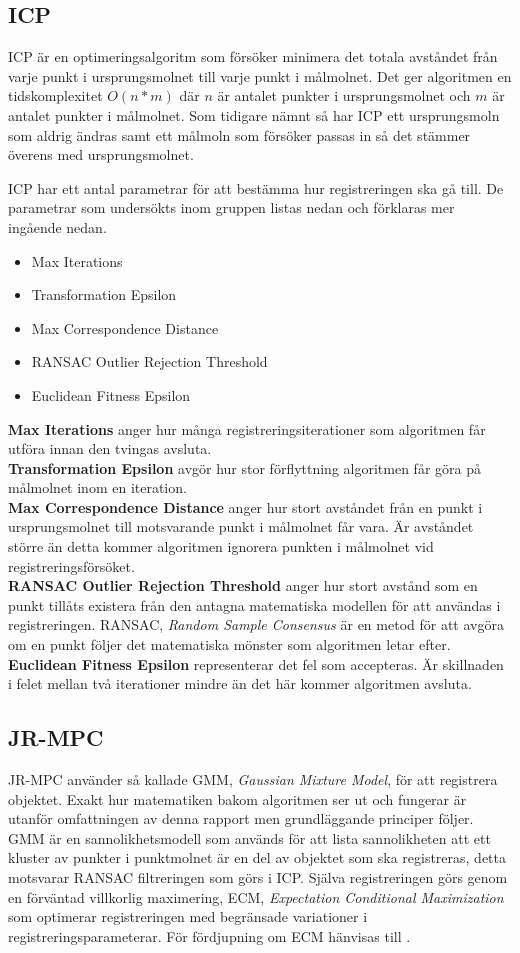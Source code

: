 \subsection{ICP}
ICP är en optimeringsalgoritm som försöker minimera det totala avståndet från varje punkt i ursprungsmolnet till varje punkt i målmolnet. Det ger algoritmen en tidskomplexitet $ \mathit{O(n*m)} $ där $ \mathit{n} $ är antalet punkter i ursprungsmolnet och $ \mathit{m} $ är antalet punkter i målmolnet. Som tidigare nämnt så har ICP ett ursprungsmoln som aldrig ändras samt ett målmoln som försöker passas in så det stämmer överens med ursprungsmolnet. 

ICP har ett antal parametrar för att bestämma hur registreringen ska gå till. De parametrar som undersökts inom gruppen listas nedan och förklaras mer ingående nedan.
\begin{itemize}
	\item Max Iterations
	\item Transformation Epsilon
	\item Max Correspondence Distance
	\item RANSAC Outlier Rejection Threshold
	\item Euclidean Fitness Epsilon
\end{itemize}
\textbf{Max Iterations} anger hur många registrerings\-iterationer som algoritmen får utföra innan den tvingas avsluta.\\
\textbf{Transformation Epsilon} avgör hur stor förflyttning algoritmen får göra på målmolnet inom en iteration.\\
\textbf{Max Correspondence Distance} anger hur stort avståndet från en punkt i ursprungsmolnet till motsvarande punkt i målmolnet får vara. Är avståndet större än detta kommer algoritmen ignorera punkten i målmolnet vid registreringsförsöket.\\
\textbf{RANSAC Outlier Rejection Threshold} anger hur stort avstånd som en punkt tillåts existera från den antagna matematiska modellen för att användas i registreringen. RANSAC, \textit{Random Sample Consensus} är en metod för att avgöra om en punkt följer det matematiska mönster som algoritmen letar efter.\\
\textbf{Euclidean Fitness Epsilon} representerar det fel som accepteras. Är skillnaden i felet mellan två iterationer mindre än det här kommer algoritmen avsluta.

\subsection{JR-MPC}
JR-MPC använder så kallade GMM, \textit{Gaussian Mixture Model}, för att registrera objektet. Exakt hur matematiken bakom algoritmen ser ut och fungerar är utanför omfattningen av denna rapport men grundläggande principer följer. GMM är en sannolikhetsmodell som används för att lista sannolikheten att ett kluster av punkter i punktmolnet är en del av objektet som ska registreras, detta motsvarar RANSAC filtreringen som görs i ICP. Själva registreringen görs genom en förväntad villkorlig maximering, ECM, \textit{Expectation Conditional Maximization} som optimerar registreringen med begränsade variationer i registreringsparameterar. För fördjupning om ECM hänvisas till \cite{roche2011algorithm}.

